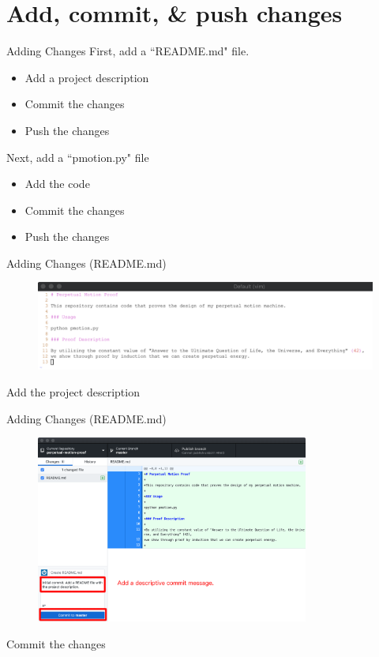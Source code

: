 \documentclass{beamer}
\begin{document}
    \section{Add, commit, \& push changes}\label{sec:add,-commit,&push-changes}
    \begin{frame}{Adding Changes}
        First, add a ``README.md" file.
        \begin{itemize}
            \item Add a project description
            \item Commit the changes
            \item Push the changes
        \end{itemize}

        Next, add a ``pmotion.py" file
        \begin{itemize}
            \item Add the code
            \item Commit the changes
            \item Push the changes
        \end{itemize}
    \end{frame}

    \begin{frame}{Adding Changes (README.md)}
        \begin{figure}
            \centering
            \includegraphics[width=\textwidth]{figures/add_1.png}
        \end{figure}
        \centering
        Add the project description
    \end{frame}

    \begin{frame}{Adding Changes (README.md)}
        \begin{figure}
            \centering
            \includegraphics[width=0.8\textwidth]{figures/add_2.png}
        \end{figure}

        \centering
        Commit the changes
    \end{frame}
\end{document}

